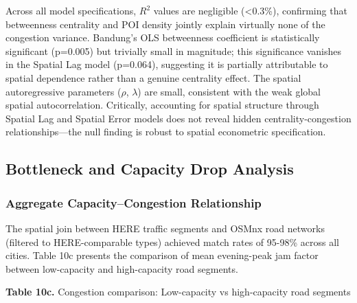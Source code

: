 \documentclass[12pt,a4paper]{article}
\begin{document}
Across all model specifications, $R^2$ values are negligible (<0.3\%), confirming that betweenness centrality and POI density jointly explain virtually none of the congestion variance. Bandung's OLS betweenness coefficient is statistically significant (p=0.005) but trivially small in magnitude; this significance vanishes in the Spatial Lag model (p=0.064), suggesting it is partially attributable to spatial dependence rather than a genuine centrality effect. The spatial autoregressive parameters ($\rho$, $\lambda$) are small, consistent with the weak global spatial autocorrelation. Critically, accounting for spatial structure through Spatial Lag and Spatial Error models does not reveal hidden centrality-congestion relationships---the null finding is robust to spatial econometric specification.

\subsection{Bottleneck and Capacity Drop Analysis}

\subsubsection{Aggregate Capacity--Congestion Relationship}

The spatial join between HERE traffic segments and OSMnx road networks (filtered to HERE-comparable types) achieved match rates of 95-98\% across all cities. Table 10c presents the comparison of mean evening-peak jam factor between low-capacity and high-capacity road segments.

\textbf{Table 10c.} Congestion comparison: Low-capacity vs high-capacity road segments
\end{document}
